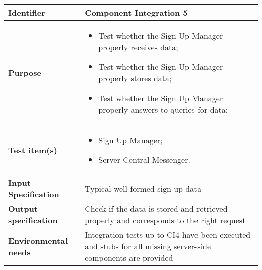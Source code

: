 \begin{center}
\begin{tabular}{lp{}}
\toprule
\textbf{Identifier}		&	Component Integration 5\\
\midrule
\textbf{Purpose}		&	\begin{itemize}
					\item Test whether the Sign Up Manager properly receives data;
					\item Test whether the Sign Up Manager properly stores data;
					\item Test whether the Sign Up Manager properly answers to queries for data;
					\end{itemize}	\\
\textbf{Test item(s)}	&	\begin{itemize}
					\item Sign Up Manager;
					\item Server Central Messenger.
					\end{itemize}	\\
\textbf{Input Specification}	&	Typical well-formed sign-up data\\
\textbf{Output specification}	&	Check if the data is stored and retrieved properly and corresponds to the right request\\
\textbf{Environmental needs}	&	Integration tests up to CI4 have been executed and stubs for all missing server-side components are provided\\
\bottomrule
\end{tabular}
\end{center}


